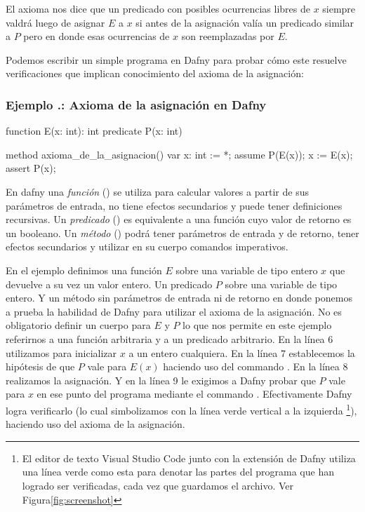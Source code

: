 \documentclass[12pt, a4paper, openany, fleqn]{book}
\newcounter{example}[chapter]
\renewcommand{\theexample}{\thechapter.\arabic{example}}
\newcommand{\example}[1]{
  \refstepcounter{example} %
  \subsubsection*{Ejemplo \theexample: #1}
}
\begin{document}
    El axioma nos dice que un predicado con posibles ocurrencias libres de $x$ siempre valdrá luego de asignar $E$ a $x$ si antes de la asignación valía un predicado similar a $P$ pero en donde esas ocurrencias de $x$ son reemplazadas por $E$.

    Podemos escribir un simple programa en Dafny para probar cómo este resuelve verificaciones que implican conocimiento del axioma de la asignación:

    \example{Axioma de la asignación en Dafny}
    \begin{greenbox}
    \begin{dafny}[gobble=8]
        function E(x: int): int
        predicate P(x: int)

        method axioma_de_la_asignacion()
        {
            var x: int := *;
            assume P(E(x));
            x := E(x);
            assert P(x);
        }
    \end{dafny}
    \end{greenbox}

    En dafny una \textit{función} () se utiliza para calcular valores a partir de sus parámetros de entrada, no tiene efectos secundarios y puede tener definiciones recursivas. Un \textit{predicado} () es equivalente a una función cuyo valor de retorno es un booleano. Un \textit{método} () podrá tener parámetros de entrada y de retorno, tener efectos secundarios y utilizar en su cuerpo comandos imperativos.

    En el ejemplo definimos una función $E$ sobre una variable de tipo entero $x$ que devuelve a su vez un valor entero.
    Un predicado $P$ sobre una variable de tipo entero.
    Y un método sin parámetros de entrada ni de retorno en donde ponemos a prueba la habilidad de Dafny para utilizar el axioma de la asignación.
    No es obligatorio definir un cuerpo para $E$ y $P$ lo que nos permite en este ejemplo referirnos a una función arbitraria y a un predicado arbitrario.
    En la línea 6 utilizamos  para inicializar $x$ a un entero cualquiera.
    En la línea 7 establecemos la hipótesis de que $P$ vale para $E(x)$ haciendo uso del commando .
    En la línea 8 realizamos la asignación.
    Y en la línea 9 le exigimos a Dafny probar que $P$ vale para $x$ en ese punto del programa mediante el commando .
    Efectivamente Dafny logra verificarlo (lo cual simbolizamos con la línea verde vertical a la izquierda \footnote{El editor de texto Visual Studio Code junto con la extensión de Dafny utiliza una línea verde como esta para denotar las partes del programa que han logrado ser verificadas, cada vez que guardamos el archivo. Ver Figura\ref{fig:screenshot}}), haciendo uso del axioma de la asignación.
\end{document}
